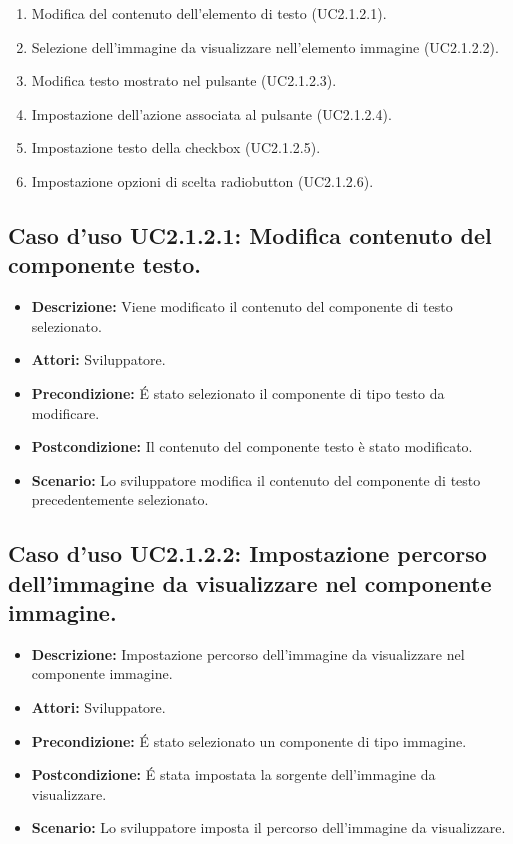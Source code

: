\begin{itemize}
\begin{enumerate}
\item Modifica del contenuto dell'elemento di testo (UC2.1.2.1).
\item Selezione dell'immagine da visualizzare nell'elemento immagine (UC2.1.2.2).
\item Modifica testo mostrato nel pulsante (UC2.1.2.3).
\item Impostazione dell'azione associata al pulsante (UC2.1.2.4).
\item Impostazione testo della checkbox (UC2.1.2.5).
\item Impostazione opzioni di scelta radiobutton (UC2.1.2.6). 
\end{enumerate} 
\end{itemize}

\subsection{Caso d'uso UC2.1.2.1: Modifica contenuto del componente testo.}
\begin{itemize}
\item[]\textbf{Descrizione:} Viene modificato il contenuto del componente di testo selezionato.
\item[]\textbf{Attori:} Sviluppatore. 
\item[]\textbf{Precondizione:} \'E stato selezionato il componente di tipo testo da modificare. 
\item[]\textbf{Postcondizione:} Il contenuto del componente testo è stato modificato. 
\item[]\textbf{Scenario:}
 Lo sviluppatore modifica il contenuto del componente di testo precedentemente selezionato. 
\end{itemize}

\subsection{Caso d'uso UC2.1.2.2: Impostazione percorso dell'immagine da visualizzare nel componente immagine.}
\begin{itemize}
\item[]\textbf{Descrizione:} Impostazione percorso dell'immagine da visualizzare nel componente immagine.
\item[]\textbf{Attori:} Sviluppatore. 
\item[]\textbf{Precondizione:} \'E stato selezionato un componente di tipo immagine. 
\item[]\textbf{Postcondizione:} \'E stata impostata la sorgente dell'immagine da visualizzare. 
\item[]\textbf{Scenario:}
 Lo sviluppatore imposta il percorso dell'immagine da visualizzare. 
\end{itemize}

